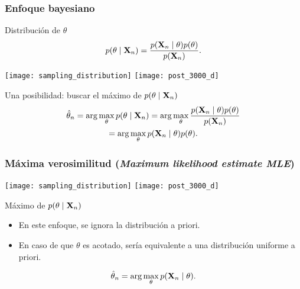 \documentclass[table]{beamer}
\begin{document}
\begin{frame}
    \frametitle{Enfoque bayesiano}
    \begin{block}{Distribución de $\theta$}
        \begin{equation*}
            \pdf{\theta \mid \Xvec_{n}} = \frac{\pdf{\Xvec_{n} \mid \theta} \pdf{\theta}}{\pdf{\Xvec_{n}}} .
        \end{equation*}
    \end{block}
    \begin{center}
        \texttt{[image: sampling\_distribution]}
        \texttt{[image: post\_3000\_d]}
    \end{center}
    \begin{block}{Una posibilidad: buscar el máximo de $\pdf{\theta \mid \Xvec_{n}}$}
        \begin{multline*}
            \hat{\theta}_{n} = \arg \max_{\theta} \pdf{\theta \mid \Xvec_{n}} = \arg \max_{\theta} \frac{\pdf{\Xvec_{n} \mid \theta} \pdf{\theta}}{\pdf{\Xvec_{n}}}
            \\
            = \arg \max_{\theta} \pdf{\Xvec_{n} \mid \theta} \pdf{\theta} .
        \end{multline*}
    \end{block}
\end{frame}

\begin{frame}
    \frametitle{Máxima verosimilitud (\emph{Maximum likelihood estimate MLE})}
    \begin{center}
        \texttt{[image: sampling\_distribution]}
        \texttt{[image: post\_3000\_d]}
    \end{center}
    \begin{block}{Máximo de $\pdf{\theta \mid \Xvec_{n}}$}
        \begin{itemize}
            \item En este enfoque, se ignora la distribución a priori.
            \item En caso de que $\theta$ es acotado, sería equivalente a una distribución uniforme a priori.
        \end{itemize}
        \begin{equation*}
            \hat{\theta}_{n}
            = \arg \max_{\theta} \pdf{\Xvec_{n} \mid \theta} .
        \end{equation*}
    \end{block}
\end{frame}
\end{document}
